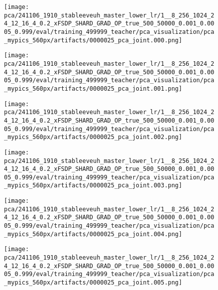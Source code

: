 \begin{figure*}[p]
\begin{subfigure}[t]{0.097\textwidth}
    \end{subfigure}
    \begin{subfigure}[t]{0.097\textwidth}
        \centering
        \texttt{[image: pca/241106\_1910\_stableeveuh\_master\_lower\_lr/1\_\_8\_256\_1024\_24\_12\_16\_4\_0.2\_xFSDP\_SHARD\_GRAD\_OP\_true\_500\_50000\_0.001\_0.0005\_0.999/eval/training\_499999\_teacher/pca\_visualization/pca\_mypics\_560px/artifacts/0000025\_pca\_joint.000.png]}
    \end{subfigure}\hfill
    \begin{subfigure}[t]{0.097\textwidth}
        \centering
        \texttt{[image: pca/241106\_1910\_stableeveuh\_master\_lower\_lr/1\_\_8\_256\_1024\_24\_12\_16\_4\_0.2\_xFSDP\_SHARD\_GRAD\_OP\_true\_500\_50000\_0.001\_0.0005\_0.999/eval/training\_499999\_teacher/pca\_visualization/pca\_mypics\_560px/artifacts/0000025\_pca\_joint.001.png]}
    \end{subfigure}\hfill
    \begin{subfigure}[t]{0.097\textwidth}
        \centering
        \texttt{[image: pca/241106\_1910\_stableeveuh\_master\_lower\_lr/1\_\_8\_256\_1024\_24\_12\_16\_4\_0.2\_xFSDP\_SHARD\_GRAD\_OP\_true\_500\_50000\_0.001\_0.0005\_0.999/eval/training\_499999\_teacher/pca\_visualization/pca\_mypics\_560px/artifacts/0000025\_pca\_joint.002.png]}
    \end{subfigure}\hfill
    \begin{subfigure}[t]{0.097\textwidth}
        \centering
        \texttt{[image: pca/241106\_1910\_stableeveuh\_master\_lower\_lr/1\_\_8\_256\_1024\_24\_12\_16\_4\_0.2\_xFSDP\_SHARD\_GRAD\_OP\_true\_500\_50000\_0.001\_0.0005\_0.999/eval/training\_499999\_teacher/pca\_visualization/pca\_mypics\_560px/artifacts/0000025\_pca\_joint.003.png]}
    \end{subfigure}\hfill
    \begin{subfigure}[t]{0.097\textwidth}
        \centering
        \texttt{[image: pca/241106\_1910\_stableeveuh\_master\_lower\_lr/1\_\_8\_256\_1024\_24\_12\_16\_4\_0.2\_xFSDP\_SHARD\_GRAD\_OP\_true\_500\_50000\_0.001\_0.0005\_0.999/eval/training\_499999\_teacher/pca\_visualization/pca\_mypics\_560px/artifacts/0000025\_pca\_joint.004.png]}
    \end{subfigure}\hfill
    \begin{subfigure}[t]{0.097\textwidth}
        \centering
        \texttt{[image: pca/241106\_1910\_stableeveuh\_master\_lower\_lr/1\_\_8\_256\_1024\_24\_12\_16\_4\_0.2\_xFSDP\_SHARD\_GRAD\_OP\_true\_500\_50000\_0.001\_0.0005\_0.999/eval/training\_499999\_teacher/pca\_visualization/pca\_mypics\_560px/artifacts/0000025\_pca\_joint.005.png]}

\end{subfigure}
\end{figure*}
